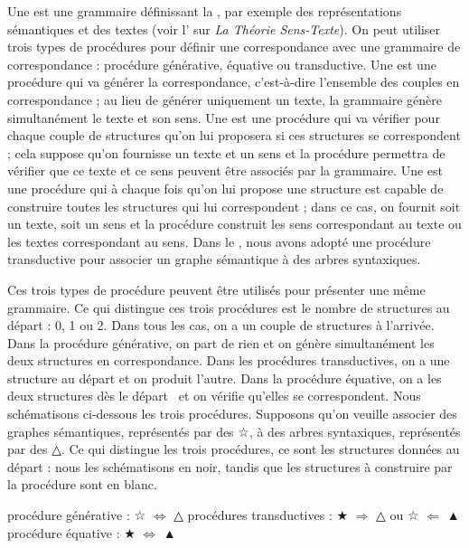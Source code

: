 {    Une  est une grammaire définissant la , par exemple des représentations sémantiques et des textes (voir l’ sur \textit{La Théorie Sens-Texte}). On peut utiliser trois types de procédures pour définir une correspondance avec une grammaire de correspondance : procédure générative, équative ou transductive. Une  est une procédure qui va générer la correspondance, c’est-à-dire l’ensemble des couples en correspondance ; au lieu de générer uniquement un texte, la grammaire génère simultanément le texte et son sens. Une  est une procédure qui va vérifier pour chaque couple de structures qu’on lui proposera si ces structures se correspondent ; cela suppose qu’on fournisse un texte et un sens et la procédure permettra de vérifier que ce texte et ce sens peuvent être associés par la grammaire. Une  est une procédure qui à chaque fois qu’on lui propose une structure est capable de construire toutes les structures qui lui correspondent ; dans ce cas, on fournit soit un texte, soit un sens et la procédure construit les sens correspondant au texte ou les textes correspondant au sens. Dans le , nous avons adopté une procédure transductive pour associer un graphe sémantique à des arbres syntaxiques.

    Ces trois types de procédure peuvent être utilisés pour présenter une même grammaire. Ce qui distingue ces trois procédures est le nombre de structures au départ : 0, 1 ou 2. Dans tous les cas, on a un couple de structures à l’arrivée. Dans la procédure générative, on part de rien et on génère simultanément les deux structures en correspondance. Dans les procédures transductives, on a une structure au départ et on produit l’autre. Dans la procédure équative, on a les deux structures dès le départ~ et on vérifie qu’elles se correspondent. Nous schématisons ci-dessous les trois procédures. Supposons qu’on veuille associer des graphes sémantiques, représentés par des {\xitsfont ☆}, à des arbres syntaxiques, représentés par des {\xitsfont\scriptsize △}. Ce qui distingue les trois procédures, ce sont les structures données au départ : nous les schématisons en noir, tandis que les structures à construire par la procédure sont en blanc.
    
    \ea procédure générative :        {\xitsfont ☆} ${\Leftrightarrow}$ {\xitsfont\scriptsize △}
    \ex procédures transductives :    {\xitsfont ★} ${\Rightarrow}$ {\xitsfont\scriptsize △}
                                       ou {\xitsfont ☆} ${\Leftarrow}$ {\xitsfont\scriptsize ▲}
    \ex procédure équative :          {\xitsfont ★} ${\Leftrightarrow}$ {\xitsfont\scriptsize ▲}
    \z
    
}
